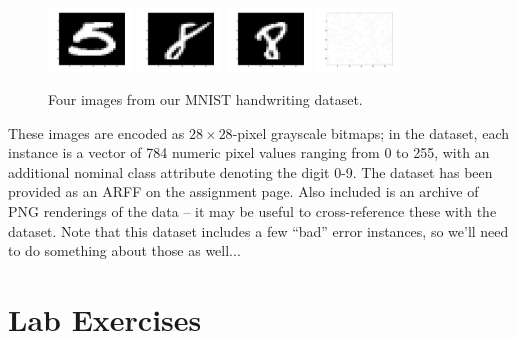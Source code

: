 \documentclass[11pt]{cselabheader}
\begin{document}
\begin{figure}[h]
  \centering
  \includegraphics[width=0.2\textwidth]{mnist_5.png}
  \includegraphics[width=0.2\textwidth]{mnist_8.png}
  \includegraphics[width=0.2\textwidth]{mnist_8_2.png}
  \includegraphics[width=0.2\textwidth]{mnist_bad.png}
  \caption{Four images from our MNIST handwriting dataset.}
\end{figure}

These images are encoded as $28 \times 28$-pixel grayscale bitmaps; in the dataset, each instance is a vector of 784 numeric pixel values ranging from 0 to 255, with an additional nominal class attribute denoting the digit 0-9. The dataset has been provided as an ARFF on the assignment page. Also included is an archive of PNG renderings of the data -- it may be useful to cross-reference these with the dataset. Note that this dataset includes a few ``bad'' error instances, so we'll need to do something about those as well...

\pagebreak

\section{Lab Exercises}
\end{document}
